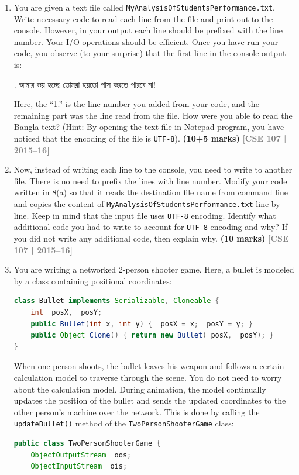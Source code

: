 \documentclass[12pt,a3paper]{article}
\newcommand{\yr}[1]{\hfill\textcolor{gray}{\small\textbf{[#1]}}}
\newcommand{\mk}[1]{\textcolor{orange!70!black}{\small\textbf{(#1 marks)}}}
\begin{document}
\begin{enumerate}
\yr{CSE 107 | 2016--17, 2017--18}




\item You are given a text file called \texttt{MyAnalysisOfStudentsPerformance.txt}. Write necessary code to read each line from the file and print out to the console. However, in your output each line should be prefixed with the line number. Your I/O operations should be efficient. Once you have run your code, you observe (to your surprise) that the first line in the console output is:
\begin{center}
    {. আমার ভয় হচ্ছে তোমরা হয়তো পাস করতে পারবে না!}
\end{center}
Here, the ``1.'' is the line number you added from your code, and the remaining part was the line read from the file. How were you able to read the Bangla text? (Hint: By opening the text file in Notepad program, you have noticed that the encoding of the file is \texttt{UTF-8}). \mk{10+5}
\yr{CSE 107 | 2015--16}




\item Now, instead of writing each line to the console, you need to write to another file. There is no need to prefix the lines with line number. Modify your code written in 8(a) so that it reads the destination file name from command line and copies the content of \texttt{MyAnalysisOfStudentsPerformance.txt} line by line. Keep in mind that the input file uses \texttt{UTF-8} encoding. Identify what additional code you had to write to account for \texttt{UTF-8} encoding and why? If you did not write any additional code, then explain why. \mk{10}
\yr{CSE 107 | 2015--16}




\item You are writing a networked 2-person shooter game. Here, a bullet is modeled by a class containing positional coordinates:
\begin{lstlisting}[language=Java]
class Bullet implements Serializable, Cloneable {
    int _posX, _posY;
    public Bullet(int x, int y) { _posX = x; _posY = y; }
    public Object Clone() { return new Bullet(_posX, _posY); }
}
\end{lstlisting}
When one person shoots, the bullet leaves his weapon and follows a certain calculation model to traverse through the scene. You do not need to worry about the calculation model. During animation, the model continually updates the position of the bullet and sends the updated coordinates to the other person's machine over the network. This is done by calling the \texttt{updateBullet()} method of the \texttt{TwoPersonShooterGame} class:
\begin{lstlisting}[language=Java]
public class TwoPersonShooterGame {
    ObjectOutputStream _oos; 
    ObjectInputStream _ois;


\end{lstlisting}
\end{enumerate}
\end{document}
